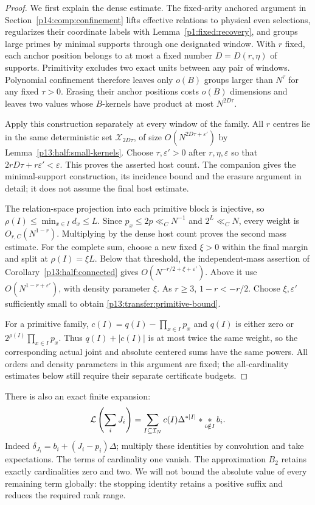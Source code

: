 \begin{proof}
We first explain the dense estimate. The fixed-arity anchored argument
in Section~\ref{p14:comp:confinement} lifts effective relations to
physical even selections, regularizes their coordinate labels with
Lemma~\ref{p1:fixed:recovery}, and groups large primes by minimal
supports through one designated window. With $r$ fixed, each anchor
position belongs to at most a fixed number $D=D(r,\eta)$ of supports.
Primitivity excludes two exact units between any pair of windows.
Polynomial confinement therefore leaves only $o(B)$ groups larger
than $N^\tau$ for any fixed $\tau>0$. Erasing their anchor positions
costs $o(B)$ dimensions and leaves two values whose $B$-kernels have
product at most $N^{2D\tau}$.

Apply this construction separately at every window of the family.
All $r$ centres lie in the same deterministic set
$\mathcal X_{2D\tau}$, of size
$O(N^{2D\tau+\varepsilon'})$ by
Lemma~\ref{p13:half:small-kernels}.
Choose $\tau,\varepsilon'>0$ after $r,\eta,\varepsilon$ so that
$2rD\tau+r\varepsilon'<\varepsilon$.
This proves the asserted host count. The companion gives the
minimal-support construction, its incidence bound and the erasure
argument in detail; it does not assume the final host estimate.

The relation-space projection into each primitive block is injective,
so $\rho(I)\le\min_{x\in I}d_x\le L$. Since $p_x\le2p\ll_C N^{-1}$
and $2^L\ll_C N$, every weight is $O_{r,C}(N^{1-r})$.
Multiplying by the dense host count proves the second mass estimate.
For the complete sum, choose a new fixed $\xi>0$ within the final
margin and split at $\rho(I)=\xi L$.
Below that threshold, the independent-mass assertion of
Corollary~\ref{p13:half:connected} gives
$O(N^{-r/2+\xi+\varepsilon'})$.
Above it use $O(N^{1-r+\varepsilon'})$, with density parameter $\xi$.
As $r\ge3$, $1-r<-r/2$. Choose $\xi,\varepsilon'$ sufficiently small
to obtain \eqref{p13:transfer:primitive-bound}.

For a primitive family,
$c(I)=q(I)-\prod_{x\in I}p_x$ and
$q(I)$ is either zero or $2^{\rho(I)}\prod_{x\in I}p_x$.
Thus $q(I)+|c(I)|$ is at most twice the same weight, so the
corresponding actual joint and absolute centered sums have the same
powers. All orders and density parameters in this argument are fixed;
the all-cardinality estimates below still require their separate
certificate budgets.
\end{proof}

There is also an exact finite expansion:
\begin{equation}
 \mathcal L\left(\sum_iJ_i\right)
   =\sum_{I\subseteq\mathcal I_N}c(I)\Delta^{*|I|}*
                                \mathop{*}_{i\notin I}b_i.
 \label{p13:transfer:exact-expansion}
\end{equation}
Indeed $\delta_{J_i}=b_i+(J_i-p_i)\Delta$; multiply these identities
by convolution and take expectations. The terms of cardinality one
vanish. The approximation $B_2$ retains exactly cardinalities zero and
two. We will not bound the absolute value of every remaining term
globally: the stopping identity retains a positive suffix and reduces
the required rank range.

